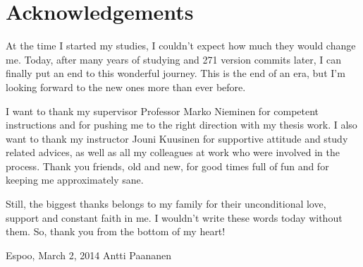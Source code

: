 \documentclass[12pt,a4paper,oneside,pdftex]{report}
\newcommand{\DATE}{March 2, 2014}
\newcommand{\AUTHOR}{Antti Paananen}
\begin{document}




\chapter*{Acknowledgements}

At the time I started my studies, I couldn't expect how much they would change me.
Today, after many years of studying and 271 version commits later, I can finally put an end to this wonderful journey.
This is the end of an era, but I'm looking forward to the new ones more than ever before.

I want to thank my supervisor Professor Marko Nieminen for competent instructions and for pushing me to the right direction with my thesis work. 
I also want to thank my instructor Jouni Kuusinen for supportive attitude and study related advices, as well as all my colleagues at work who were involved in the process.
Thank you friends, old and new, for good times full of fun and for keeping me approximately sane.

Still, the biggest thanks belongs to my family for their unconditional love, support and constant faith in me. I wouldn't write these words today without them.
So, thank you from the bottom of my heart! 

\vskip 10mm

\noindent Espoo, \DATE
\vskip 5mm
\noindent\AUTHOR

\cleardoublepage
% 
\end{document}
